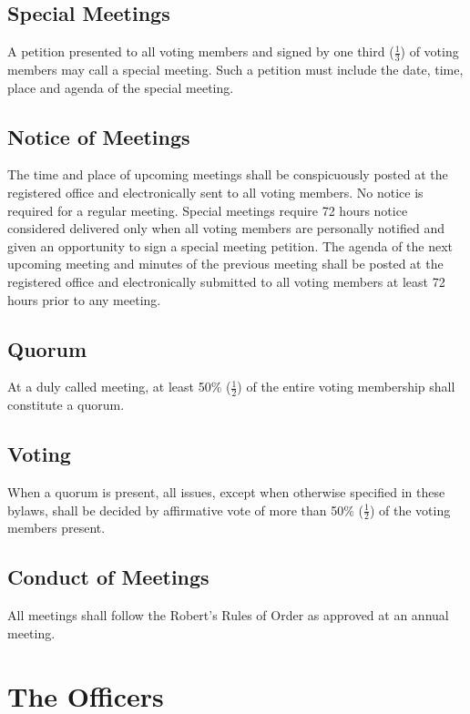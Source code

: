 \documentclass[10pt,letterpaper,titlepage]{article}
\begin{document}
\subsection{Special Meetings}
\label{specialmeet}

A petition presented to all voting members and signed by one third
($\frac{1}{3}$) of voting members may call a special meeting.
Such a petition must include the date, time, place and agenda of the special
meeting.

\subsection{Notice of Meetings}

The time and place of upcoming meetings shall be conspicuously posted at the
registered office and electronically sent to all voting members.
No notice is required for a regular meeting.
Special meetings require 72 hours notice considered delivered only when all
voting members are personally notified and given an opportunity to sign a
special meeting petition.
The agenda of the next upcoming meeting and minutes of the previous meeting
shall be posted at the registered office and electronically submitted to all
voting members at least 72 hours prior to any meeting.

\subsection{Quorum}

At a duly called meeting, at least 50\% ($\frac{1}{2}$) of the entire voting
membership shall constitute a quorum.

\subsection{Voting}

When a quorum is present, all issues, except when otherwise specified in these
bylaws, shall be decided by affirmative vote of more than 50\% ($\frac{1}{2}$)
of the voting members present.

\subsection{Conduct of Meetings}
\label{condofmeet}

All meetings shall follow the Robert's Rules of Order as approved at an annual
meeting.


\section{The Officers}
\label{officers}
\end{document}
